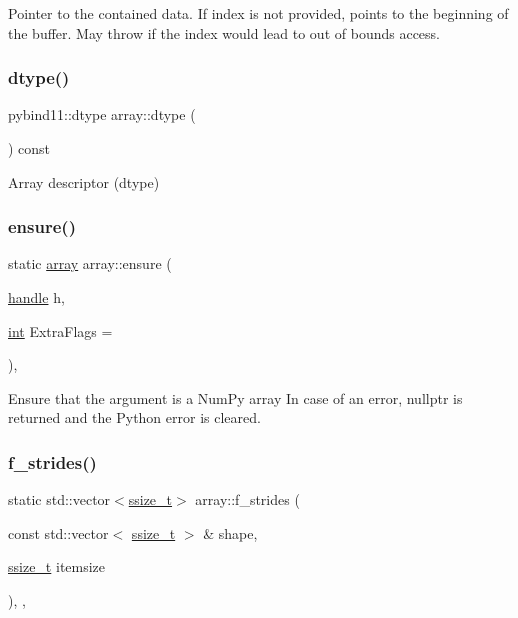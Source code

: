 Pointer to the contained data. If index is not provided, points to the beginning of the buffer. May throw if the index would lead to out of bounds access. \mbox{\label{classarray_a49535f32396582e415a61f3aac9c78b3}} 
\subsubsection{\texorpdfstring{dtype()}{dtype()}}
{\footnotesize\ttfamily pybind11\+::dtype array\+::dtype (\begin{DoxyParamCaption}{ }\end{DoxyParamCaption}) const\hspace{0.3cm}{\ttfamily [inline]}}



Array descriptor (dtype) 

\mbox{\label{classarray_a4b19125eed75474c00a93c829dba3a8b}} 
\subsubsection{\texorpdfstring{ensure()}{ensure()}}
{\footnotesize\ttfamily static \mbox{\hyperlink{classarray}{array}} array\+::ensure (\begin{DoxyParamCaption}\item[{\mbox{\hyperlink{classhandle}{handle}}}]{h,  }\item[{\mbox{\hyperlink{warnings_8h_a74f207b5aa4ba51c3a2ad59b219a423b}{int}}}]{Extra\+Flags = {} }\end{DoxyParamCaption})\hspace{0.3cm}{\ttfamily [inline]}, {\ttfamily [static]}}

Ensure that the argument is a Num\+Py array In case of an error, nullptr is returned and the Python error is cleared. \mbox{\label{classarray_a4668d1a96b1acab41acf6f38fa89c122}} 
\subsubsection{\texorpdfstring{f\_strides()}{f\_strides()}}
{\footnotesize\ttfamily static std\+::vector$<$\mbox{\hyperlink{detail_2common_8h_ac430d16fc097b3bf0a7469cfd09decda}{ssize\+\_\+t}}$>$ array\+::f\+\_\+strides (\begin{DoxyParamCaption}\item[{const std\+::vector$<$ \mbox{\hyperlink{detail_2common_8h_ac430d16fc097b3bf0a7469cfd09decda}{ssize\+\_\+t}} $>$ \&}]{shape,  }\item[{\mbox{\hyperlink{detail_2common_8h_ac430d16fc097b3bf0a7469cfd09decda}{ssize\+\_\+t}}}]{itemsize }\end{DoxyParamCaption})\hspace{0.3cm}{\ttfamily [inline]}, {\ttfamily [static]}, {\ttfamily [protected]}}

